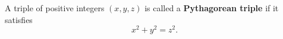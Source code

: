 A triple of positive integers $(x, y, z)$ is called a \textbf{Pythagorean triple} if it satisfies
$$x^2 + y^2 = z^2.$$
